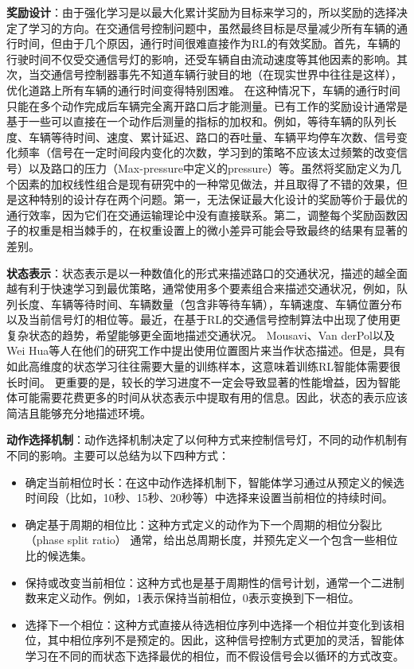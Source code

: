 \textbf{奖励设计}：由于强化学习是以最大化累计奖励为目标来学习的，所以奖励的选择决定了学习的方向。在交通信号控制问题中，虽然最终目标是尽量减少所有车辆的通行时间，但由于几个原因，通行时间很难直接作为RL的有效奖励。首先，车辆的行驶时间不仅受交通信号灯的影响，还受车辆自由流动速度等其他因素的影响。其次，当交通信号控制器事先不知道车辆行驶目的地（在现实世界中往往是这样），优化道路上所有车辆的通行时间变得特别困难。 在这种情况下，车辆的通行时间只能在多个动作完成后车辆完全离开路口后才能测量。已有工作的奖励设计通常是基于一些可以直接在一个动作后测量的指标的加权和。例如，等待车辆的队列长度、车辆等待时间、速度、累计延迟、路口的吞吐量、车辆平均停车次数、信号变化频率（信号在一定时间段内变化的次数，学习到的策略不应该太过频繁的改变信号）以及路口的压力（Max-pressure中定义的pressure）等。虽然将奖励定义为几个因素的加权线性组合是现有研究中的一种常见做法，并且取得了不错的效果，但是这种特别的设计存在两个问题。第一，无法保证最大化设计的奖励等价于最优的通行效率，因为它们在交通运输理论中没有直接联系。第二，调整每个奖励函数因子的权重是相当棘手的，在权重设置上的微小差异可能会导致最终的结果有显著的差别。

\textbf{状态表示}：状态表示是以一种数值化的形式来描述路口的交通状况，描述的越全面越有利于快速学习到最优策略，通常使用多个要素组合来描述交通状况，例如，队列长度、车辆等待时间、车辆数量（包含非等待车辆），车辆速度、车辆位置分布以及当前信号灯的相位等。最近，在基于RL的交通信号控制算法中出现了使用更复杂状态的趋势，希望能够更全面地描述交通状况。 Mousavi、Van derPol以及Wei Hua等人在他们的研究工作中提出使用位置图片来当作状态描述。但是，具有如此高维度的状态学习往往需要大量的训练样本，这意味着训练RL智能体需要很长时间。 更重要的是，较长的学习进度不一定会导致显著的性能增益，因为智能体可能需要花费更多的时间从状态表示中提取有用的信息。因此，状态的表示应该简洁且能够充分地描述环境。

\textbf{动作选择机制}：动作选择机制决定了以何种方式来控制信号灯，不同的动作机制有不同的影响。主要可以总结为以下四种方式：
\begin{itemize}
    \item 确定当前相位时长：在这中动作选择机制下，智能体学习通过从预定义的候选时间段（比如，10秒、15秒、20秒等）中选择来设置当前相位的持续时间。
    \item 确定基于周期的相位比：这种方式定义的动作为下一个周期的相位分裂比（phase split ratio） 通常，给出总周期长度，并预先定义一个包含一些相位比的候选集。
    \item 保持或改变当前相位：这种方式也是基于周期性的信号计划，通常一个二进制数来定义动作。例如，1表示保持当前相位，0表示变换到下一相位。
    \item 选择下一个相位：这种方式直接从待选相位序列中选择一个相位并变化到该相位，其中相位序列不是预定的。因此，这种信号控制方式更加的灵活，智能体学习在不同的而状态下选择最优的相位，而不假设信号会以循环的方式改变。
\end{itemize}

